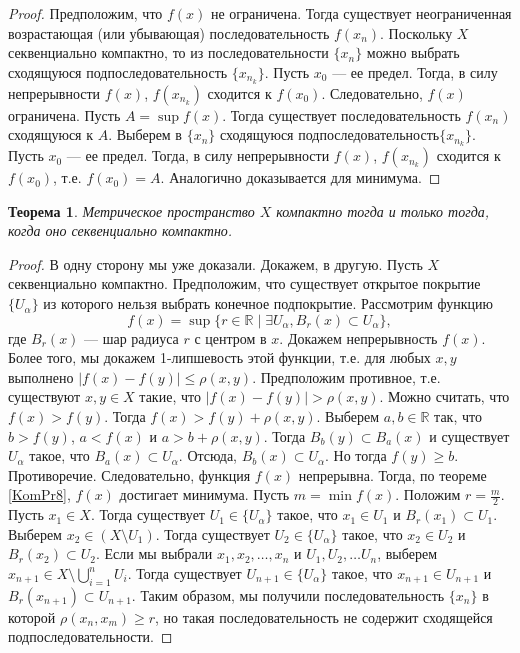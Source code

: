 \documentclass[12pt, titlepage, oneside]{amsbook}
\newcommand{\RR}{\mathbb{R}}
\newtheorem{theorem}{Теорема}[chapter]
\theoremstyle{definition}
\theoremstyle{remark}
\begin{document}
\begin{proof}
	Предположим, что $f(x)$ не ограничена. Тогда существует неограниченная возрастающая (или убывающая) последовательность $f(x_n)$. Поскольку $X$ секвенциально компактно, то из последовательности $\{x_n\}$ можно выбрать сходящуюся подпоследовательность $\{x_{n_k}\}$. Пусть $x_0$ --- ее предел. Тогда, в силу непрерывности $f(x)$, $f(x_{n_k})$ сходится к $f(x_0)$. Следовательно, $f(x)$ ограничена. Пусть $A=\sup f(x)$. Тогда существует последовательность $f(x_n)$ сходящуюся к $A$. Выберем в $\{x_n\}$ сходящуюся подпоследовательность$\{x_{n_k}\}$. Пусть $x_0$ --- ее предел. Тогда, в силу непрерывности $f(x)$, $f(x_{n_k})$ сходится к $f(x_0)$, т.е. $f(x_0)=A$. Аналогично доказывается для минимума.
\end{proof}

\begin{theorem}
	\label{KomPr9}
	Метрическое пространство $X$ компактно тогда и только тогда, когда оно секвенциально компактно.
\end{theorem}

\begin{proof}
	В одну сторону мы уже доказали. Докажем, в другую. Пусть $X$ секвенциально компактно. Предположим, что существует открытое покрытие $\{U_{\alpha}\}$ из которого нельзя выбрать конечное подпокрытие. Рассмотрим функцию $$f(x)=\sup\{r\in\RR\mid\exists U_{\alpha},  B_r(x)\subset U_{\alpha}\},$$ где $B_r(x)$ --- шар радиуса $r$ с центром в $x$. Докажем непрерывность $f(x)$. Более того, мы докажем 1-липшевость этой функции, т.е. для любых $x,y$ выполнено $|f(x)-f(y)|\leq\rho(x,y)$. Предположим противное, т.е. существуют $x,y\in X$ такие, что $|f(x)-f(y)|>\rho(x,y)$. Можно считать, что $f(x)>f(y)$. Тогда $f(x)>f(y)+\rho(x,y)$. Выберем $a,b\in\RR$ так, что $b>f(y)$, $a<f(x)$ и $a>b+\rho(x,y)$. Тогда $B_b(y)\subset B_a(x)$ и существует $U_{\alpha}$  такое, что $B_a(x)\subset U_{\alpha}$. Отсюда, $B_b(x)\subset U_{\alpha}$. Но тогда $f(y)\geq b$. Противоречие. Следовательно, функция $f(x)$ непрерывна. Тогда, по теореме \ref{KomPr8}, $f(x)$ достигает минимума. Пусть $m=\min f(x)$. Положим $r=\frac{m}{2}$. Пусть $x_1\in X$. Тогда существует $U_1\in\{U_{\alpha}\}$ такое, что $x_1\in U_1$ и $B_r(x_1)\subset U_1$. Выберем $x_2\in(X\setminus U_1)$. Тогда существует $U_2\in\{U_{\alpha}\}$ такое, что $x_2\in U_2$ и $B_r(x_2)\subset U_2$. Если мы выбрали $x_1,x_2,\ldots,x_n$ и $U_1,U_2,\ldots U_n$, выберем $x_{n+1}\in X\setminus\bigcup\limits_{i=1}^n U_i$. Тогда существует $U_{n+1}\in\{U_{\alpha}\}$ такое, что $x_{n+1}\in U_{n+1}$ и $B_r(x_{n+1})\subset U_{n+1}$. Таким образом, мы получили последовательность $\{x_n\}$ в которой $\rho(x_n,x_m)\geq r$, но такая последовательность не содержит сходящейся подпоследовательности.
\end{proof}
\end{document}
